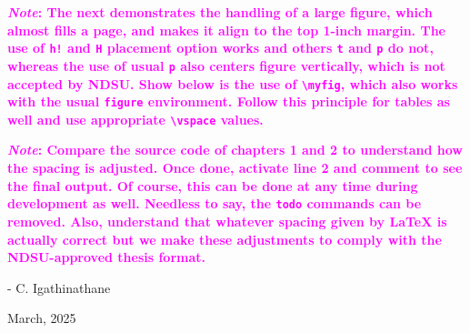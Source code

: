 \documentclass[12pt,mathdesign,showframe,showgrid]{ndsu-thesis-2022}
\begin{document}




\vspace{-0.2in}%
\kant[9]

{\bfseries
\textcolor{magenta}{\emph{Note}: The next demonstrates the handling of a large figure, which almost fills a page, and makes it align to the top 1-inch margin. The use of \texttt{h!} and \texttt{H} placement option works and others \texttt{t} and \texttt{p} do not, whereas the use of usual \texttt{p} also centers figure vertically, which is not accepted by NDSU. Show below is the use of \texttt{\textbackslash myfig}, which also works with the usual \texttt{figure} environment. Follow this principle for tables as well and use appropriate \texttt{\textbackslash vspace} values. }
}


\newpage
{}


{\bfseries
\textcolor{magenta}{\emph{Note}: Compare the source code of chapters 1 and 2 to understand how the spacing is adjusted. Once done, activate line 2 and comment to see the final output. Of course, this can be done at any time during development as well. Needless to say, the \texttt{todo} commands can be removed. Also, understand that whatever spacing given by \LaTeX{} is actually correct but we make these adjustments to comply with the NDSU-approved thesis format.}
}

\hfill{\small - C. Igathinathane}

\vspace{-0.1in}
\hfill{\scriptsize March, 2025}
\end{document}
